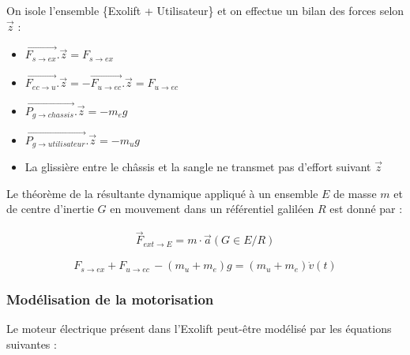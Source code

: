\ifprof
\begin{texteCache}

 On isole l'ensemble \{Exolift + Utilisateur\} et on effectue un bilan des forces selon $\overrightarrow{z}$ :


\begin{itemize}
\item
  \(\overrightarrow{F_{s \rightarrow ex}}.\overrightarrow{z} = F_{s \rightarrow ex}\)
\item
  \(\overrightarrow{F_{ec \rightarrow u}}.\overrightarrow{z} = - \overrightarrow{F_{u \rightarrow ec}}.\overrightarrow{z} = F_{u \rightarrow ec}\)
\item
  \(\overrightarrow{P_{g \rightarrow chassis}}.\overrightarrow{z} = - m_{e}g\)
\item
  \(\overrightarrow{P_{g \rightarrow utilisateur}}.\overrightarrow{z} = - m_{u}g\)
\item
  La glissière entre le châssis et la sangle ne transmet pas d'effort
  suivant \(\overrightarrow{z}\)

\end{itemize}

\end{texteCache}
\else



Le théorème de la résultante dynamique appliqué à un ensemble $E$ de masse $m$ et de centre d'inertie $G$ en mouvement dans un référentiel galiléen $R$ est donné par : 

\begin{align}\label{PFD}
 \overrightarrow{F}_{ext\to E}=m\cdot \overrightarrow{a}(G\in E/R)
\end{align}


\fi
{}


\ifprof
\begin{texteCache}

 \[F_{s \rightarrow ex} + F_{u \rightarrow ec\ } - \left( m_{u} + m_{e} \right)g = \left( m_{u} + m_{e} \right)\dot{v}(t)\]
 
 \vspace{3cm}

\end{texteCache}
\else




\subsubsection{Modélisation de la motorisation}
Le moteur électrique présent dans l'Exolift peut-être modélisé par les équations suivantes :


